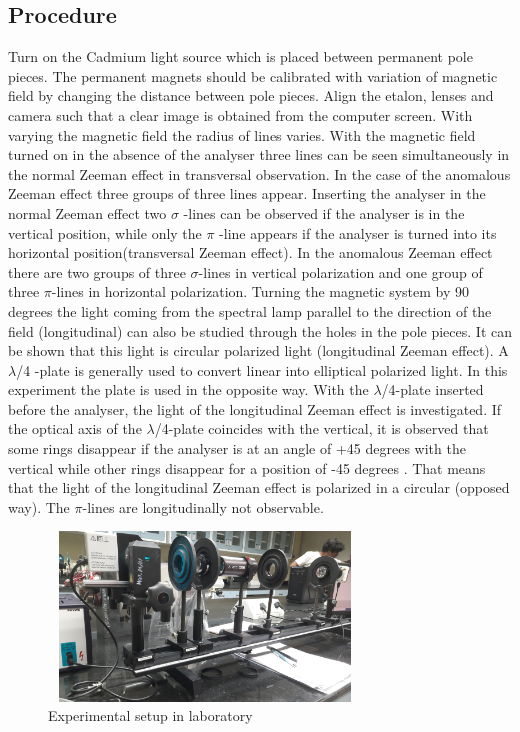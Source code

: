 \documentclass[a4paper, amsfonts, amssymb, amsmath, reprint, showkeys, nofootinbib, twoside]{revtex4-1}
\begin{document}
\subsection{Procedure}
Turn on the Cadmium light source which is placed between permanent pole pieces. The permanent magnets should be calibrated with variation of magnetic field by changing the distance between pole pieces. Align the etalon, lenses and camera such that a clear image is obtained from the computer screen. With varying the magnetic field the radius of lines varies. With the magnetic field turned on in the absence of the analyser three lines can be seen simultaneously in the normal Zeeman effect in transversal observation. In the case of the anomalous Zeeman effect three groups of three lines appear. Inserting the analyser in the normal Zeeman effect two $\sigma$ -lines can be observed if the analyser is in the vertical position, while only the $\pi$ -line appears if the analyser is turned into its horizontal position(transversal Zeeman effect). In the anomalous Zeeman effect there are two groups of three $\sigma$-lines in vertical polarization and one group of three $\pi$-lines in horizontal polarization. Turning the magnetic system by 90 degrees the light coming from the spectral lamp parallel to the direction of the field (longitudinal) can also be studied through the holes in the pole pieces. It can be shown that this light is circular polarized light (longitudinal Zeeman effect). A $\lambda$/4 -plate is generally used to convert linear into elliptical polarized light. In this experiment the plate is used in the opposite way. With the $\lambda$/4-plate inserted before the analyser, the light of the longitudinal Zeeman effect is investigated. If the optical axis of the $\lambda$/4-plate coincides with the vertical, it is observed that some rings disappear if the analyser is at an angle of +45 degrees with the vertical while other rings disappear for a position of -45 degrees . That means that the light of the longitudinal Zeeman effect is polarized in a circular (opposed way). The $\pi$-lines are longitudinally not observable.

\begin{figure}[H] %
	\centering
	\includegraphics[width=8.3cm,height=4.5cm]{2} 
	\caption{Experimental setup in laboratory}
	\label{}
\end{figure}
\end{document}
